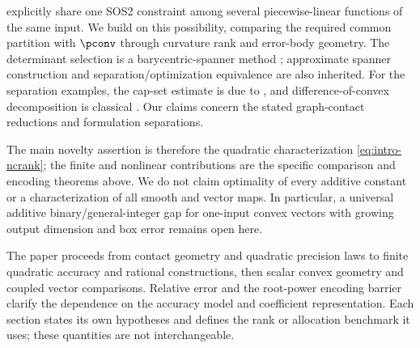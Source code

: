\citet[Proposition 1]{lyu2026} explicitly share one SOS2 constraint among
several piecewise-linear functions of the same input. We build on this
possibility, comparing the required common partition with $\pconv$ through
curvature rank and error-body geometry. The determinant selection is a
barycentric-spanner method \citep{awerbuch2004}; approximate spanner
construction \citep{plevrakis2020} and separation/optimization equivalence
\citep{gls1981} are also inherited. For the separation examples, the cap-set
estimate is due to \citet{ellenberg2017}, and difference-of-convex
decomposition is classical \citep{hartman1959}. Our claims concern the
stated graph-contact reductions and formulation separations.

The main novelty assertion is therefore the quadratic characterization
\eqref{eq:intro-ncrank}; the finite and nonlinear contributions are the
specific comparison and encoding theorems above. We do not claim optimality
of every additive constant or a characterization of all smooth and vector
maps. In particular, a universal additive binary/general-integer gap for
one-input convex vectors with growing output dimension and box error
remains open here.

The paper proceeds from contact geometry and quadratic precision laws to
finite quadratic accuracy and rational constructions, then scalar convex
geometry and coupled vector comparisons. Relative error and the
root-power encoding barrier clarify the dependence on the accuracy model
and coefficient representation. Each section states its own hypotheses
and defines the rank or allocation benchmark it uses; these quantities
are not interchangeable.
